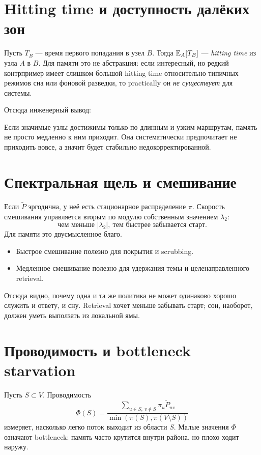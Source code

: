 \section{Hitting time и доступность далёких зон}

Пусть $T_B$ — время первого попадания в узел $B$. Тогда $\mathbb{E}_A[T_B]$ — \emph{hitting
time} из узла $A$ в $B$. Для памяти это не абстракция: если интересный, но редкий
контрпример имеет слишком большой hitting time относительно типичных режимов сна
или фоновой разведки, то practically он \emph{не существует} для системы.

Отсюда инженерный вывод:
\begin{principle}
Если значимые узлы достижимы только по длинным и узким маршрутам, память не просто
медленно к ним приходит. Она систематически предпочитает не приходить вовсе, а
значит будет стабильно недокорректированной.
\end{principle}

\section{Спектральная щель и смешивание}

Если $\widetilde P$ эргодична, у неё есть стационарное распределение $\pi$. Скорость
смешивания управляется вторым по модулю собственным значением $\lambda_2$:
\[
\text{чем меньше } |\lambda_2|,\ \text{тем быстрее забывается старт}.
\]
Для памяти это двусмысленное благо.

\begin{itemize}
\item Быстрое смешивание полезно для покрытия и scrubbing.
\item Медленное смешивание полезно для удержания темы и целенаправленного retrieval.
\end{itemize}

Отсюда видно, почему одна и та же политика не может одинаково хорошо служить и
ответу, и сну. Retrieval хочет меньше забывать старт; сон, наоборот, должен уметь
выползать из локальной ямы.

\section{Проводимость и bottleneck starvation}

Пусть $S\subset V$. Проводимость
\[
\Phi(S)=\frac{\sum_{u\in S,\ v\notin S}\pi_u \widetilde P_{uv}}
{\min(\pi(S),\pi(V\setminus S))}
\]
измеряет, насколько легко поток выходит из области $S$. Малые значения $\Phi$
означают bottleneck: память часто крутится внутри района, но плохо ходит наружу.

